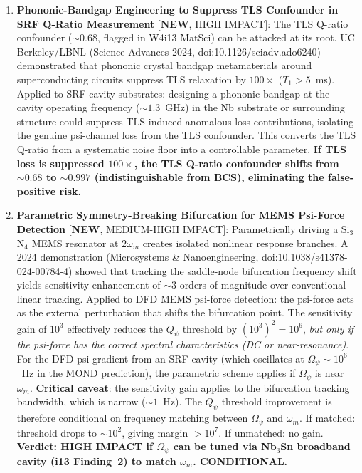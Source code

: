 \documentclass[11pt]{article}
\newcommand{\Opsi}{\Omega_\psi}
\newcommand{\Qpsi}{Q_\psi}
\theoremstyle{definition}
\theoremstyle{remark}
\begin{document}
\begin{tcolorbox}[colback=blue!5!white, colframe=blue!60!black,
  title=\textbf{W4i14 --- P2 PASSIVE DETECTION: TOP 5 FINDINGS}]
\begin{enumerate}[nosep]
\item \textbf{Phononic-Bandgap Engineering to Suppress TLS Confounder
  in SRF Q-Ratio Measurement} [\textbf{NEW}, HIGH IMPACT]:
  The TLS Q-ratio confounder ($\sim 0.68$, flagged in W4i13 MatSci)
  can be attacked at its root. UC Berkeley/LBNL (Science Advances
  2024, doi:10.1126/sciadv.ado6240) demonstrated that phononic
  crystal bandgap metamaterials around superconducting circuits
  suppress TLS relaxation by $100\times$ ($T_1 > 5$~ms).
  Applied to SRF cavity substrates: designing a phononic bandgap at
  the cavity operating frequency ($\sim 1.3$~GHz) in the
  Nb substrate or surrounding structure could suppress TLS-induced
  anomalous loss contributions, isolating the genuine psi-channel
  loss from the TLS confounder. This converts the TLS Q-ratio from
  a systematic noise floor into a controllable parameter.
  \textbf{If TLS loss is suppressed $100\times$, the TLS Q-ratio
  confounder shifts from $\sim 0.68$ to $\sim 0.997$ (indistinguishable
  from BCS), eliminating the false-positive risk.}

\item \textbf{Parametric Symmetry-Breaking Bifurcation for MEMS
  Psi-Force Detection} [\textbf{NEW}, MEDIUM-HIGH IMPACT]:
  Parametrically driving a Si$_3$N$_4$ MEMS resonator at $2\omega_m$
  creates isolated nonlinear response branches. A 2024 demonstration
  (Microsystems \& Nanoengineering, doi:10.1038/s41378-024-00784-4)
  showed that tracking the saddle-node bifurcation frequency shift
  yields sensitivity enhancement of $\sim 3$ orders of magnitude over
  conventional linear tracking. Applied to DFD MEMS psi-force
  detection: the psi-force acts as the external perturbation that
  shifts the bifurcation point. The sensitivity gain of $10^3$
  effectively reduces the $\Qpsi$ threshold by $(10^3)^2 = 10^6$,
  \emph{but only if the psi-force has the correct spectral
  characteristics (DC or near-resonance)}. For the DFD psi-gradient
  from an SRF cavity (which oscillates at $\Opsi \sim 10^6$~Hz in
  the MOND prediction), the parametric scheme applies if $\Opsi$
  is near $\omega_m$. \textbf{Critical caveat}: the sensitivity gain
  applies to the bifurcation tracking bandwidth, which is narrow
  ($\sim 1$~Hz). The $\Qpsi$ threshold improvement is therefore
  conditional on frequency matching between $\Opsi$ and $\omega_m$.
  If matched: threshold drops to $\sim 10^2$, giving margin $> 10^7$.
  If unmatched: no gain. \textbf{Verdict: HIGH IMPACT if $\Opsi$
  can be tuned via Nb$_3$Sn broadband cavity (i13 Finding~2) to
  match $\omega_m$. CONDITIONAL.}


\end{enumerate}
\end{tcolorbox}
\end{document}
